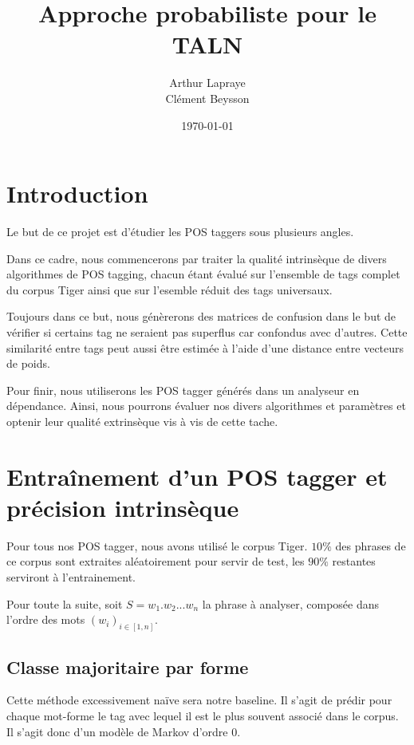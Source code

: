 \documentclass{article}
\title{Approche probabiliste pour le TALN}
\author{Arthur Lapraye\\Clément Beysson}
\date{\today}
\begin{document}
\maketitle


\tableofcontents

\newpage

\section{Introduction}

Le but de ce projet est d'étudier les POS taggers sous plusieurs angles. 

Dans ce cadre, nous commencerons par traiter la qualité intrinsèque de divers algorithmes de POS tagging, chacun étant évalué sur l'ensemble de tags complet du corpus Tiger ainsi que sur l'esemble réduit des tags universaux.

Toujours dans ce but, nous génèrerons des matrices de confusion dans le but de vérifier si certains tag ne seraient pas superflus car confondus avec d'autres. Cette similarité entre tags peut aussi être estimée à l'aide d'une distance entre vecteurs de poids.

Pour finir, nous utiliserons les POS tagger générés dans un analyseur en dépendance. Ainsi, nous pourrons évaluer nos divers algorithmes et paramètres et optenir leur qualité extrinsèque vis à vis de cette tache.


\section{Entraînement d'un POS tagger et précision intrinsèque}

Pour tous nos POS tagger, nous avons utilisé le corpus Tiger. $10\%$ des phrases de ce corpus sont extraites aléatoirement pour servir de test, les $90\%$ restantes serviront à l'entrainement.

Pour toute la suite, soit $S = w_1.w_2...w_n$ la phrase à analyser, composée dans l'ordre des mots $(w_i)_{i\in[1,n]}$.

\subsection{Classe majoritaire par forme}

Cette méthode excessivement naïve sera notre baseline. Il s'agit de prédir pour chaque mot-forme le tag avec lequel il est le plus souvent associé dans le corpus. Il s'agit donc d'un modèle de Markov d'ordre 0. 
\end{document}
